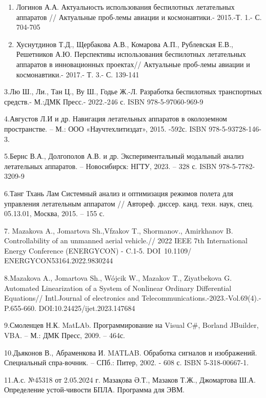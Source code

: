 \begin{noparindent}
\begin{enumerate}
\def\labelenumi{\arabic{enumi}.}
\item
  Логинов А.А. Актуальность использования беспилотных летательных
  аппаратов // Актуальные проб-лемы авиации и космонавтики.- 2015.-Т. 1.-
  С. 704-705
\item
  Хуснутдинов Т.Д., Щербакова А.В., Комарова А.П., Рублевская Е.В.,
  Решетников А.Ю. Перспективы использования беспилотных летательных
  аппаратов в инновационных проектах// Актуальные проб-лемы авиации и
  космонавтики.- 2017.- Т. 3.- С. 139-141
\end{enumerate}

3.Лю Ш., Ли., Тан Ц., Ву Ш., Годье Ж.-Л. Разработка беспилотных
транспортных средств.- М.:ДМК Пресс.- 2022.-246 с. ISBN
978-5-97060-969-9

4.Августов Л.И и др. Навигация летательных аппаратов в околоземном
пространстве. -- М.: ООО «Научтехлитиздат», 2015. -592с. ISBN
978-5-93728-146-3.

5.Бернс В.А., Долгополов А.В. и др. Экспериментальный модальный анализ
летательных аппаратов. -- Новосибирск: НГТУ, 2023. -- 328 с. ISBN
978-5-7782-3209-9

6.Танг Тхань Лам Системный анализ и оптимизация режимов полета для
управления летательным аппаратом // Автореф. диссер. канд. техн. наук,
спец. 05.13.01, Москва, 2015. -- 155 с.

7. Mazakova A., Jomartova Sh.,Vfzakov T., Shormanov., Amirkhanov B.
Controllability of an unmanned aerial vehicle.// 2022 IEEE 7th
International Energy Conference (ENERGYCON) - C.1-5.
DOI~10.1109/\\ENERGYCON53164.2022.9830244

8.Mazakova A., Jomartova Sh., Wójcik W., Mazakov T., Ziyatbekova G.
Automated Linearization of a System of Nonlinear Ordinary Differential
Equations// Intl.Journal of electronics and
Telecommunications.-2023.-Vol.69(4).-P.655-660. DOI:10.24425/ijet.2023.147684

9.Смоленцев Н.К. MatLAb. Программирование на Visual C\#, Borland
JBuilder, VBA. -- М.: ДМК Пресс, 2009. -- 464с.

10.Дьяконов В., Абраменкова И. MATLAB. Обработка сигналов и изображений.
Специальный спра-вочник. -- СПб.: Питер, 2002. - 608 с. ISBN
5-318-00667-1.

11.А.с. №45318 от 2.05.2024 г. Мазақова Ә.Т., Мазаков Т.Ж., Джомартова
Ш.А. Определение устой-чивости БПЛА. Программа для ЭВМ.


\end{noparindent}
